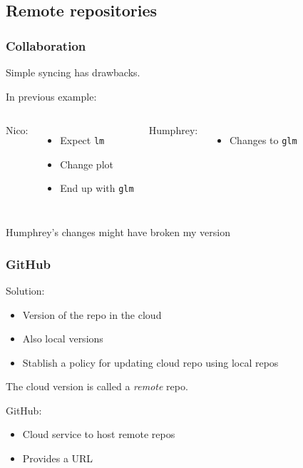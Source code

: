 \documentclass{beamer}
\begin{document}
\subsection{Remote repositories}

\begin{frame}[fragile]
    \frametitle{Collaboration}
    Simple syncing has drawbacks.

    In previous example:
    \vspace{0.4cm}
    \begin{columns}
        Nico: 
        \begin{itemize}
            \item Expect \verb|lm|
            \item Change plot
            \item End up with \verb|glm|
        \end{itemize}
        Humphrey:
        \begin{itemize}
            \item Changes to \verb|glm|
        \end{itemize}
    \end{columns}
    \vspace{0.2cm}
    
    Humphrey's changes might have broken my version
\end{frame}

\begin{frame}
    \frametitle{GitHub}
    Solution:
    \begin{itemize}
        \item Version of the repo in the cloud
        \item Also local versions
        \item Stablish a policy for updating cloud repo using local repos
    \end{itemize}

    The cloud version is called a \textit{remote} repo. 

    \vspace{0.2cm}

    GitHub: 
    \begin{itemize}
        \item Cloud service to host remote repos
        \item Provides a URL
    \end{itemize}
\end{frame}
\end{document}
